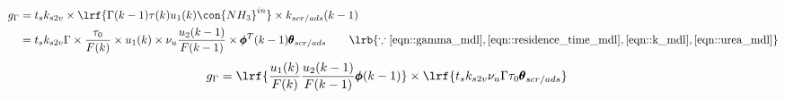 \begin{align*}
        g_\Gamma &= t_s k_{s2v} \times \lrf{\Gamma(k-1) \tau(k) u_1(k) \con{NH_3}^{in}} \times k_{scr/ads}(k-1)\\
                &= t_s k_{s2v} \Gamma \times \frac{\tau_0}{F(k)} \times u_1 (k) \times \nu_u \frac{u_2(k-1)}{F(k-1)}\times \pmb \phi^T(k-1) \pmb \theta_{scr/ads}
                \qquad \lrb{\because \ref{eqn::gamma_mdl}, \ref{eqn::residence_time_mdl}, \ref{eqn::k_mdl}, \ref{eqn::urea_mdl}}
\end{align*}
\begin{align}
        g_\Gamma &= \lrf{ \frac{u_1(k)}{F(k)} \frac{u_2(k-1)}{F(k-1)} \pmb \phi(k-1) } \times \lrf{ t_s k_{s2v} \nu_u \Gamma \tau_0 \pmb \theta_{scr/ads} }
\end{align}
